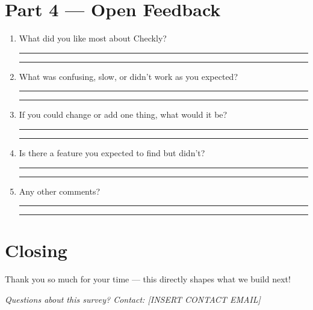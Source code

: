 \documentclass[11pt,a4paper]{article}
\newcommand{\ansline}{\par\noindent\rule{\linewidth}{0.3pt}\par\vspace{0.5em}}
\newcommand{\ansblock}{\ansline\ansline}
\begin{document}
\section*{Part 4 --- Open Feedback}

\begin{enumerate}
  \item What did you like most about Checkly?
  \ansblock
  \item What was confusing, slow, or didn't work as you expected?
  \ansblock
  \item If you could change or add one thing, what would it be?
  \ansblock
  \item Is there a feature you expected to find but didn't?
  \ansblock
  \item Any other comments?
  \ansblock
\end{enumerate}

\section*{Closing}

Thank you so much for your time --- this directly shapes what we build next!

\textit{Questions about this survey? Contact: [INSERT CONTACT EMAIL]}
\end{document}
